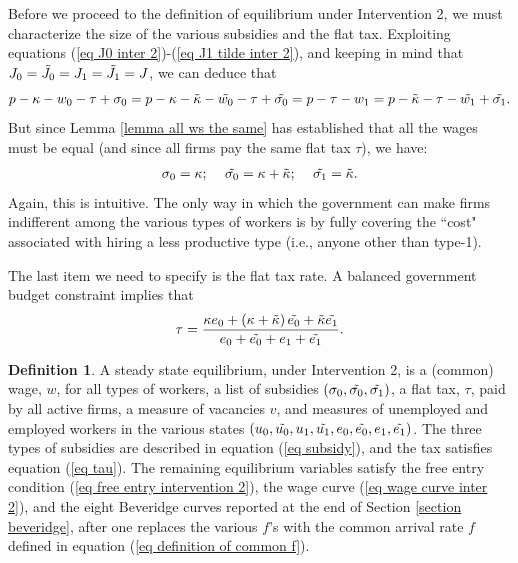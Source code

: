 \documentclass[12pt]{article} %
\theoremstyle{definition}
\newtheorem{definition}{Definition}%
\begin{document}
\noindent Before we proceed to the definition of equilibrium under Intervention 2, we must characterize the size of the various subsidies and the flat tax. Exploiting equations (\ref{eq J0 inter 2})-(\ref{eq J1 tilde inter 2}), and keeping in mind that $J_0=\Tilde{J_0}=J_1=\Tilde{J_1}=J$, we can deduce that 
$$p-\kappa-w_0-\tau+\sigma_0 = p-\kappa-\Tilde{\kappa}-\Tilde{w_0}-\tau+\Tilde{\sigma_0}=p-\tau-w_1=p-\Tilde{\kappa}-\tau-\Tilde{w_1}+\Tilde{\sigma_1}.$$
But since Lemma \ref{lemma all ws the same} has established that all the wages must be equal (and since all firms pay the same flat tax $\tau$), we have:
\begin{eqnarray}
    \sigma_0=\kappa; \,\,\,\,\,\,\, \Tilde{\sigma_0}=\kappa + \Tilde{\kappa}; \,\,\,\,\,\,\,      \Tilde{\sigma_1}=\Tilde{\kappa}. \label{eq subsidy} 
\end{eqnarray}Again, this is intuitive. The only way in which the government can make firms indifferent among the various types of workers is by fully covering the ``cost" associated with hiring a less productive type (i.e., anyone other than type-1). 


The last item we need to specify is the flat tax rate. 
A balanced government budget constraint implies that 
\begin{equation}
    \tau = \frac{\kappa e_0 + (\kappa + \Tilde{\kappa})\, \Tilde{e_0} + \Tilde{\kappa}\Tilde{e_1}}{e_0+ \Tilde{e_0}+e_1+\tilde{e_1}}. \label{eq tau}
\end{equation}


\begin{definition}\label{definition equil inter 2}
    A steady state equilibrium, under Intervention 2, is a (common) wage, $w$, for all types of workers, a list of subsidies $(\sigma_0, \Tilde{\sigma_0}, \Tilde{\sigma_1})$, a flat tax, $\tau$, paid by all active firms, a measure of vacancies $v$, and measures of unemployed and employed workers in the various states $(u_0, \Tilde{u_0}, u_1, \Tilde{u_1}, e_0, \Tilde{e_0}, e_1, \Tilde{e_1})$. The three types of subsidies are described in equation (\ref{eq subsidy}), and the tax satisfies equation (\ref{eq tau}). The remaining equilibrium variables satisfy the free entry condition (\ref{eq free entry intervention 2}), the wage curve (\ref{eq wage curve inter 2}), and the eight Beveridge curves reported at the end of Section \ref{section beveridge}, after one replaces the various $f$'s with the common arrival rate $f$ defined in equation (\ref{eq definition of common f}). 
    \end{definition} 
\end{document}
